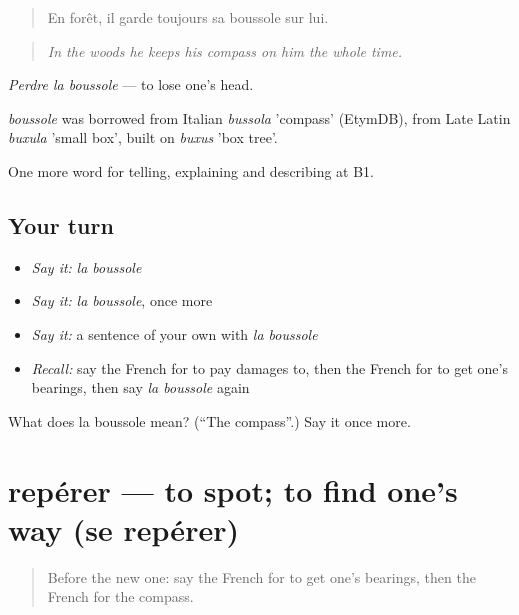 \begin{quote}
En forêt, il garde toujours sa boussole sur lui.
\end{quote}

\begin{quote}
\emph{In the woods he keeps his compass on him the whole time.}
\end{quote}

\emph{Perdre la boussole} — to lose one's head.

\begin{cousinweb}
\emph{boussole} was borrowed from Italian \emph{bussola} 'compass' (EtymDB), from Late Latin \emph{buxula} 'small box', built on \emph{buxus} 'box tree'.
\end{cousinweb}

\begin{grammarlens}[title={What you've built}]
One more word for telling, explaining and describing at B1.
\end{grammarlens}

\subsection*{Your turn}
\begin{itemize}
\raggedright
  \item \emph{Say it:} \emph{la boussole}
  \item \emph{Say it:} \emph{la boussole}, once more
  \item \emph{Say it:} a sentence of your own with \emph{la boussole}
  \item \emph{Recall:} say the French for to pay damages to, then the French for to get one’s bearings, then say \emph{la boussole} again
\end{itemize}

\begin{tcolorbox}[breakable,colback=teal!4,colframe=teal!35!black,title={Before you move on}]
What does la boussole mean? (\textquotedblleft{}The compass\textquotedblright{}.) Say it once more.
\end{tcolorbox}
\section[repérer]{repérer — to spot; to find one’s way (se repérer)}

\label{lesson:FR-C434-reperer}



\begin{quote}
Before the new one: say the French for to get one’s bearings, then the French for the compass.
\end{quote}

